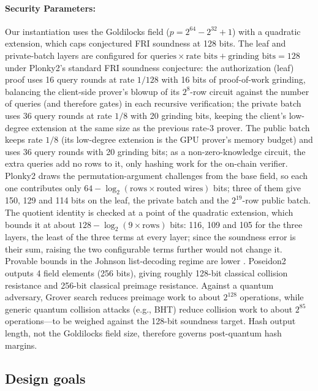\documentclass{iacrcc}
\begin{document}
\paragraph{Security Parameters:}
Our instantiation uses the Goldilocks field (\(p = 2^{64} - 2^{32} + 1\)) with a quadratic extension, which caps conjectured FRI soundness at 128 bits. The leaf and private-batch layers are configured for \(\text{queries} \times \text{rate bits} + \text{grinding bits} = 128\) under Plonky2's standard FRI soundness conjecture: the authorization (leaf) proof uses 16 query rounds at rate \(1/128\) with 16 bits of proof-of-work grinding, balancing the client-side prover's blowup of its \(2^8\)-row circuit against the number of queries (and therefore gates) in each recursive verification; the private batch uses 36 query rounds at rate \(1/8\) with 20 grinding bits, keeping the client's low-degree extension at the same size as the previous rate-3 prover. The public batch keeps rate \(1/8\) (its low-degree extension is the GPU prover's memory budget) and uses 36 query rounds with 20 grinding bits; as a non-zero-knowledge circuit, the extra queries add no rows to it, only hashing work for the on-chain verifier. Plonky2 draws the permutation-argument challenges from the base field, so each one contributes only \(64 - \log_2(\text{rows} \times \text{routed wires})\) bits; three of them give 150, 129 and 114 bits on the leaf, the private batch and the \(2^{19}\)-row public batch. The quotient identity is checked at a point of the quadratic extension, which bounds it at about \(128 - \log_2(9 \times \text{rows})\) bits: 116, 109 and 105 for the three layers, the least of the three terms at every layer; since the soundness error is their sum, raising the two configurable terms further would not change it. Provable bounds in the Johnson list-decoding regime are lower \cite{plonky2,fri}. Poseidon2 outputs 4 field elements (256 bits), giving roughly 128-bit classical collision resistance and 256-bit classical preimage resistance. Against a quantum adversary, Grover search reduces preimage work to about \(2^{128}\) operations, while generic quantum collision attacks (e.g., BHT) reduce collision work to about \(2^{85}\) operations---to be weighed against the 128-bit soundness target. Hash output length, not the Goldilocks field size, therefore governs post-quantum hash margins.

\subsection{Design goals}
\end{document}
